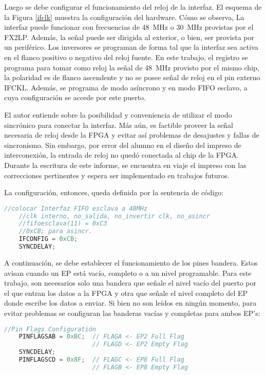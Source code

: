 	
	Luego se debe configurar el funcionamiento del reloj de la interfaz. El esquema de la Figura \ref{ifclk} muestra la configuración del hardware. Cómo se observa, La interfaz puede funcionar con frecuencias de \SI{48}{\mega\hertz} o \SI{30}{\mega\hertz} provistas por el FX2LP. Además, la señal puede ser dirigida al exterior, o bien, ser provista por un periférico. Los inversores se programan de forma tal que la interfaz sea activa en el flanco positivo o negativo del reloj fuente. En este trabajo, el registro se programa para tomar como reloj la señal de \SI{48}{\mega\hertz} provisto por el mismo chip, la polaridad es de flanco ascendente y no se posee señal de reloj en el pin externo IFCKL. Además, se programa de modo asíncrono y en modo FIFO esclavo, a cuya configuración se accede por este puerto.%
	
	El autor entiende sobre la posibilidad y conveniencia de utilizar el modo sincrónico para conectar la interfaz. Más aún, es factible proveer la señal necesaria de reloj desde la FPGA y evitar así problemas de desajustes y fallas de sincronismo. Sin embargo, por error del alumno en el diseño del impreso de interconexión, la entrada de reloj no quedó conectada al chip de la FPGA. Durante la escritura de este informe, se encuentra en viaje el impreso con las correcciones pertinentes y espera ser implementado en trabajos futuros.%
	
	La configuración, entonces, queda definida por la sentencia de código:
	
%	
	\begin{lstlisting}[language=C,backgroundcolor=\color{gray!30}]
	//colocar Interfaz FIFO esclava a 48MHz
	//clk interno, no_salida, no_invertir clk, no_asincr
	//fifoesclava(11) = 0xC3
	//0xCB; para asincr.
	IFCONFIG = 0xCB;
	SYNCDELAY;
	\end{lstlisting}
		
	A continuación, se debe establecer el funcionamiento de los pines bandera. Estos avisan cuando un EP está vacío, completo o a un nivel programable. Para este trabajo, son necesarios solo una bandera que señale el nivel vacío del puerto por el que entran los datos a la FPGA y otra que señale el nivel completo del EP donde escribe los datos a enviar. Si bien no son leídos en ningún momento, para evitar problemas se configuran las banderas vacías y completas para ambos EP's:
	
%	
	\begin{lstlisting}[language=C,backgroundcolor=\color{gray!30}]
	//Pin Flags Configuratión
	PINFLAGSAB = 0xBC;	// FLAGA <- EP2 Full Flag
						// FLAGD <- EP2 Empty Flag
	SYNCDELAY;
	PINFLAGSCD = 0x8F;	// FLAGC <- EP8 Full Flag
						// FLAGB <- EP8 Empty Flag
	\end{lstlisting}
	

